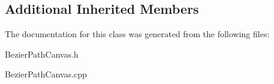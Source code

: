\subsection*{Additional Inherited Members}


The documentation for this class was generated from the following files\-:\begin{DoxyCompactItemize}
\item 
Bezier\-Path\-Canvas.\-h\item 
Bezier\-Path\-Canvas.\-cpp\end{DoxyCompactItemize}
